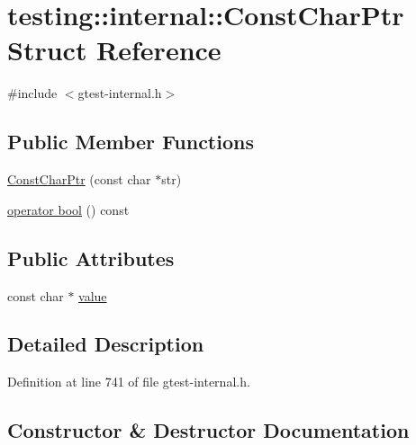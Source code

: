 \hypertarget{structtesting_1_1internal_1_1_const_char_ptr}{}\section{testing\+:\+:internal\+:\+:Const\+Char\+Ptr Struct Reference}
\label{structtesting_1_1internal_1_1_const_char_ptr}


{\ttfamily \#include $<$gtest-\/internal.\+h$>$}

\subsection*{Public Member Functions}
\begin{DoxyCompactItemize}
\item 
\hyperlink{structtesting_1_1internal_1_1_const_char_ptr_ae94f6453fa679d815994eccc63062907}{Const\+Char\+Ptr} (const char $\ast$str)
\item 
\hyperlink{structtesting_1_1internal_1_1_const_char_ptr_a891bc286350b81d1a147101c0bae5b1d}{operator bool} () const 
\end{DoxyCompactItemize}
\subsection*{Public Attributes}
\begin{DoxyCompactItemize}
\item 
const char $\ast$ \hyperlink{structtesting_1_1internal_1_1_const_char_ptr_adba40d23d5986904b605946f643cf26e}{value}
\end{DoxyCompactItemize}


\subsection{Detailed Description}


Definition at line 741 of file gtest-\/internal.\+h.



\subsection{Constructor \& Destructor Documentation}
